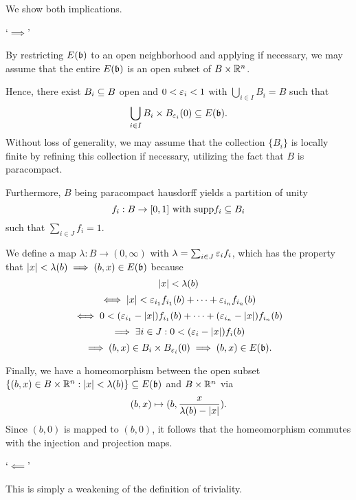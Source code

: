 \begin{myproof}
    We show both implications.

    `$\implies$'

    By restricting $E(\bb)$ to an open neighborhood
    and applying  if necessary,
    we may assume that the entire $E(\bb)$ is an open subset of $B \times \mathbb{R}^n$.

    Hence,
    there exist $B_i \subseteq{} B$ open and $0 < \varepsilon{}_i < 1$ with $\bigcup_{i \in I} B_i = B$ such that
    \[ \bigcup_{i \in I } B_i \cross \ball[\eps_i] \sub E(\bb). \]
    Without loss of generality,
    we may assume that the collection $\{B_i\}$ is locally finite by refining this collection if necessary,
    utilizing the fact that $B$ is paracompact.

    Furthermore, $B$ being paracompact hausdorff yields a partition of unity
    \[ f_i: B \to [0, 1] \text{ with } \text{supp}{f_i} \subseteq{} B_i\]
    such that $\sum_{i \in J}f_i = 1$.
    
    We define a map $\lambda: B \to (0, \infty)$ with $\lambda = \sum_{i \in J} \varepsilon{}_i f_i$,
    which has the property that $\abs{x} < \lambda(b) \implies (b, x) \in E(\bb)$ because
    \[ \vert{} x \vert{} < \lambda(b) \]
    \[ \iff  \vert{} x \vert{} < \varepsilon{}_{i_1} f_{i_1}(b) + \cdots + \varepsilon{}_{i_n} f_{i_n}(b) \]
    \[ \iff 0 < (\varepsilon{}_{i_1} - \vert{} x \vert{}) f_{i_1}(b) + \cdots + (\varepsilon{}_{i_n} - \vert{} x \vert{}) f_{i_n}(b) \]
    \[ \implies \exists i \in J: 0 < (\varepsilon{}_{i} - \vert{} x \vert{}) f_{i}(b) \]
    \[ \implies (b, x) \in B_i \cross \ball[\eps_i]  \implies (b, x) \in E(\bb). \]

    Finally, we have a homeomorphism between the open subset
    $\set{(b, x) \in B \cross \R^n}{\abs{x} < \lambda(b)} \sub E(\bb)$ and $B \times \mathbb{R}^n$ via
    \[ (b, x) \mapsto (b, \frac{x}{\lambda(b) - \vert{} x \vert{}}). \]
    Since $(b, 0)$ is mapped to $(b, 0)$, it follows that
    the homeomorphism commutes with the injection and projection maps.

    `$\impliedby$'

    This is simply a weakening of the definition of triviality. 
\end{myproof}